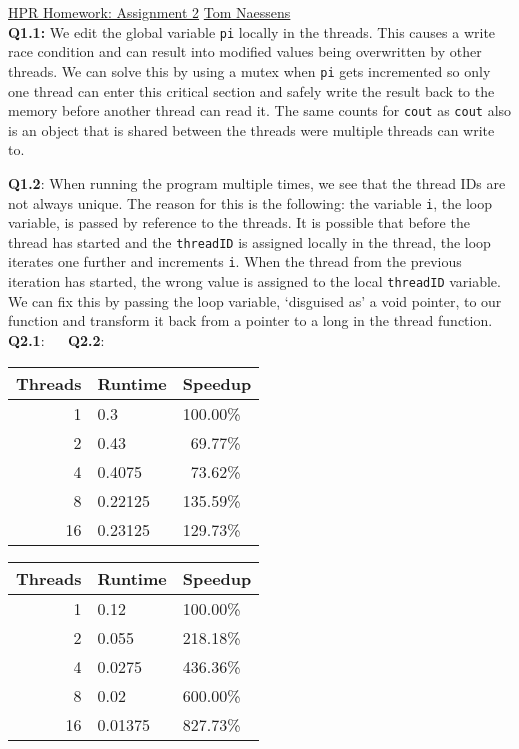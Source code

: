 \documentclass[10pt,a4paper]{article}
\author{Tom Naessens}
\begin{document}
\pagestyle{empty}

\underline{HPR Homework: Assignment 2}  \hfill \underline{Tom Naessens}\\

\textbf{Q1.1:} We edit the global variable \texttt{pi} locally in the threads. This causes a write race condition and can result into modified values being overwritten by other threads. We can solve this by using a mutex when \texttt{pi} gets incremented so only one thread can enter this critical section and safely write the result back to the memory before another thread can read it. The same counts for \texttt{cout} as \texttt{cout} also is an object that is shared between the threads were multiple threads can write to.

\textbf{Q1.2}: When running the program multiple times, we see that the thread IDs are not always unique. The reason for this is the following: the variable \texttt{i}, the loop variable, is passed by reference to the threads. It is possible that before the thread has started and the \texttt{threadID} is assigned locally in the thread, the loop iterates one further and increments \texttt{i}. When the thread from the previous iteration has started, the wrong value is assigned to the local \texttt{threadID} variable. We can fix this by passing the loop variable, `disguised as' a void pointer, to our function and transform it back from a pointer to a long in the thread function.\\

\textbf{Q2.1}: \qquad\qquad\qquad\qquad\qquad\qquad~~ \textbf{Q2.2}:\\
\begin{tabular}{r||l|l}
Threads & Runtime & Speedup \\ \hline\hline
1  & 0.3     & 100.00\% \\ \hline
2  & 0.43    & ~69.77\% \\ \hline 
4  & 0.4075  & ~73.62\% \\ \hline
8  & 0.22125 & 135.59\% \\ \hline
16 & 0.23125 & 129.73\% \\
\end{tabular} \quad
\begin{tabular}{r||l|l}
Threads & Runtime & Speedup \\ \hline\hline
1  & 0.12    & 100.00\% \\ \hline
2  & 0.055   & 218.18\% \\ \hline 
4  & 0.0275  & 436.36\% \\ \hline
8  & 0.02    & 600.00\% \\ \hline
16 & 0.01375 & 827.73\% \\
\end{tabular} \\
\end{document}
